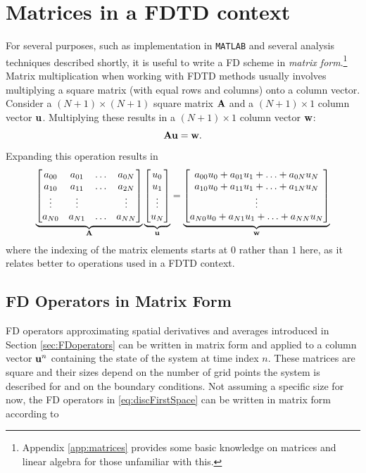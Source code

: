 \section{Matrices in a FDTD context}\label{sec:matricesFDTD}
For several purposes, such as implementation in \texttt{MATLAB} and several analysis techniques described shortly, it is useful to write a FD scheme in \textit{matrix form}.\footnote{Appendix \ref{app:matrices} provides some basic knowledge on matrices and linear algebra for those unfamiliar with this.} Matrix multiplication when working with FDTD methods usually involves multiplying a square matrix (with equal rows and columns) onto a column vector. Consider a $(N+1)\times (N+1)$ square matrix $\mathbf{A}$ and a $(N+1) \times 1$ column vector $\mathbf{u}$. Multiplying these results in a $(N+1) \times 1$ column vector $\mathbf{w}$:
\begin{equation}
    \mathbf{A}\mathbf{u} = \mathbf{w}.
\end{equation}
Expanding this operation results in
\begin{equation}
    \underbrace{\begin{bmatrix}
        a_{00} & a_{01} & \hdots & a_{0N}\\
        a_{10} & a_{11} & \hdots & a_{2N}\\
        \vdots & \vdots & &\vdots\\
        a_{N0} & a_{N1} & \hdots & a_{NN}
    \end{bmatrix}}_{\mathbf{A}}
    \underbrace{\begin{bmatrix}
        u_0\\
        u_1\\
        \vdots\\
        u_N
    \end{bmatrix}}_{\mathbf{u}} = 
    \underbrace{\begin{bmatrix}
        a_{00}u_0 + a_{01}u_1 + \hdots + a_{0N}u_N\\
        a_{10}u_0 + a_{11}u_1 + \hdots + a_{1N}u_N\\
        \vdots\\
        a_{N0}u_0 + a_{N1}u_1 + \hdots + a_{NN}u_N
    \end{bmatrix}}_{\mathbf{w}}
\end{equation}
where the indexing of the matrix elements starts at $0$ rather than $1$ here, as it relates better to operations used in a FDTD context.

\subsection{FD Operators in Matrix Form}
FD operators approximating spatial derivatives and averages introduced in Section \ref{sec:FDoperators} can be written in matrix form and applied to a column vector $\mathbf{u}^n$ containing the state of the system at time index $n$. These matrices are square and their sizes depend on the number of grid points the system is described for and on the boundary conditions. Not assuming a specific size for now, the FD operators in \eqref{eq:discFirstSpace} can be written in matrix form according to
\setstacktabbedgap{4pt}
\def\lrgap{\kern3pt}

